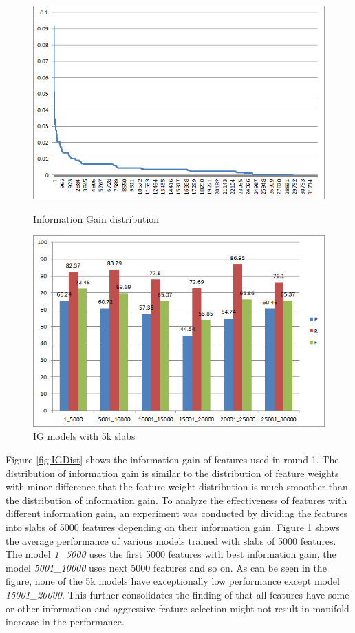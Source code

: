 \begin{figure}
\centering
\begin{minipage}{.5\textwidth}
  \centering
  \includegraphics[width=.95\textwidth]{figures/IGDistr1.png}
  \caption{Information Gain distribution}
  \label{fig:IGDist}
\end{minipage}%
\begin{minipage}{.5\textwidth}
  \centering
  \includegraphics[width=.95\textwidth]{figures/IG5kSlabsComp.png}
  \caption{IG models with 5k slabs}
  \label{fig:IG5kComp}
\end{minipage}
\end{figure} 

Figure \ref{fig:IGDist} shows the information gain of features used in round 1. The distribution of information gain is similar to the distribution of feature weights with minor difference that the feature weight distribution is much smoother than the distribution of information gain. To analyze the effectiveness of features with different information gain, an experiment was conducted by dividing the features into slabs of 5000 features depending on their information gain. Figure \ref{fig:IG5kComp} shows the average performance of various models trained with slabs of 5000 features. The model \textit{1\_5000} uses the first 5000 features with best information gain, the model \textit{5001\_10000} uses next 5000 features and so on. As can be seen in the figure, none of the 5k models have exceptionally low performance except model \textit{15001\_20000}. This further consolidates the finding of \cite{joachims1998text} that all features have some or other information and aggressive feature selection might not result in manifold increase in the performance.

